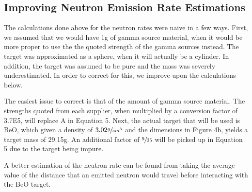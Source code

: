 \documentclass[%
12pt,
twoside,
reprint,
amsmath,amssymb,
aps,
]{article}
\begin{document}
	\subsection{Improving Neutron Emission Rate Estimations}
	\par The calculations done above for the neutron rates were naive in a few ways. First, we assumed that we would have 1g of gamma source material, when it would be more proper to use the the quoted strength of the gamma sources instead. The target was approximated as a sphere, when it will actually be a cylinder. In addition, the target was assumed to be pure and the mass was severely underestimated. In order to correct for this, we improve upon the calculations below.
	\par The easiest issue to correct is that of the amount of gamma source material. The strengths quoted from each supplier, when multiplied by a conversion factor of 3.7E5, will replace A in Equation 5. Next, the actual target that will be used is BeO, which given a density of $3.02 \sfrac{g}{cm^{3}}$ and the dimensions in Figure 4b, yields a target mass of 29.15g. An additional factor of $\sfrac{9}{25}$ will be picked up in Equation 5 due to the target being impure.
	\par A better estimation of the neutron rate can be found from taking the average value of the distance that an emitted neutron would travel before interacting with the BeO target.
	
\end{document}
